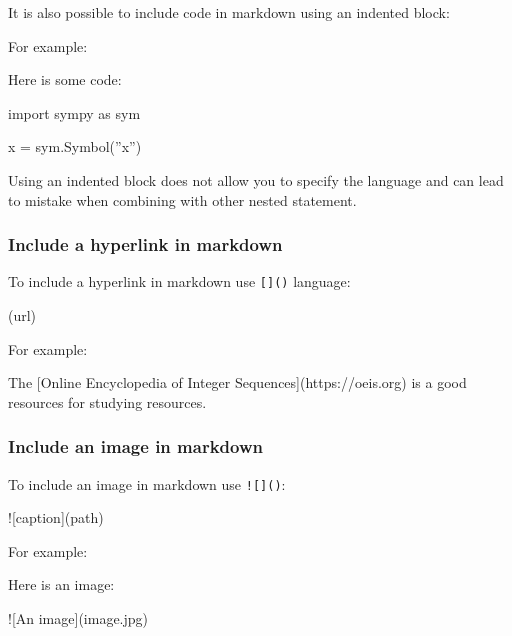 It is also possible to include code in markdown using an indented block:


For example:

\begin{md}
Here is some code:

    import sympy as sym

    x = sym.Symbol(''x'')
\end{md}


\begin{note}
Using an indented block does not allow you to specify the language and can lead
to mistake when combining with other nested statement.
\end{note}


\subsubsection{Include a hyperlink in markdown}
\label{\detokenize{building-tools/06-documentation/how/main:how-to-include-a-hyperlink-in-markdown}}\label{\detokenize{building-tools/06-documentation/how/main:id7}}

To include a hyperlink in markdown use \texttt{{[}{]}()}
language:

\begin{md}
[text](url)
\end{md}


For example:

\begin{md}
The [Online Encyclopedia of Integer Sequences](https://oeis.org) is a good resources for studying
resources.
\end{md}


\subsubsection{Include an image in markdown}
\label{\detokenize{building-tools/06-documentation/how/main:how-to-include-an-image-in-markdown}}\label{\detokenize{building-tools/06-documentation/how/main:id8}}

To include an image in markdown use \texttt{!{[}{]}()}:

\begin{md}
![caption](path)
\end{md}


For example:

\begin{md}
Here is an image:

![An image](image.jpg)
\end{md}

